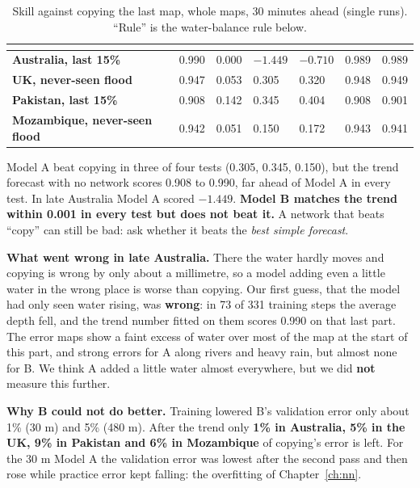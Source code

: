 \begin{table}[!htbp]
\centering\small
\caption{Skill against copying the last map, whole maps, 30 minutes ahead (single runs). ``Rule'' is the water-balance rule below.}\label{tab:p1}
\begin{tabularx}{\linewidth}{|>{\bfseries}p{3.5cm}|Y|Y|Y|Y|Y|Y|}
\hline
{}  &  &  &  &  &  & \\ \hline
Australia, last 15\% & 0.990 & 0.000 & $-1.449$ & $-0.710$ & 0.989 & 0.989\\ \hline
UK, never-seen flood & 0.947 & 0.053 & 0.305 & 0.320 & 0.948 & 0.949\\ \hline
Pakistan, last 15\% & 0.908 & 0.142 & 0.345 & 0.404 & 0.908 & 0.901\\ \hline
Mozambique, never-seen flood & 0.942 & 0.051 & 0.150 & 0.172 & 0.943 & 0.941\\ \hline
\end{tabularx}
\end{table}

Model A beat copying in three of four tests (0.305, 0.345, 0.150), but the trend forecast with no network scores 0.908 to 0.990, far ahead of Model A in every test. In late Australia Model A scored $-1.449$. \textbf{Model B matches the trend within 0.001 in every test but does not beat it.} A network that beats ``copy'' can still be bad: ask whether it beats the \emph{best simple forecast}.


\textbf{What went wrong in late Australia.} There the water hardly moves and copying is wrong by only about a millimetre, so a model adding even a little water in the wrong place is worse than copying. Our first guess, that the model had only seen water rising, was \textbf{wrong}: in 73 of 331 training steps the average depth fell, and the trend number fitted on them scores 0.990 on that last part. The error maps show a faint excess of water over most of the map at the start of this part, and strong errors for A along rivers and heavy rain, but almost none for B. We think A added a little water almost everywhere, but we did \textbf{not} measure this further.

\textbf{Why B could not do better.} Training lowered B's validation error only about 1\% (30 m) and 5\% (480 m). After the trend only \textbf{1\% in Australia, 5\% in the UK, 9\% in Pakistan and 6\% in Mozambique} of copying's error is left. For the 30 m Model A the validation error was lowest after the second pass and then rose while practice error kept falling: the overfitting of Chapter~\ref{ch:nn}.

